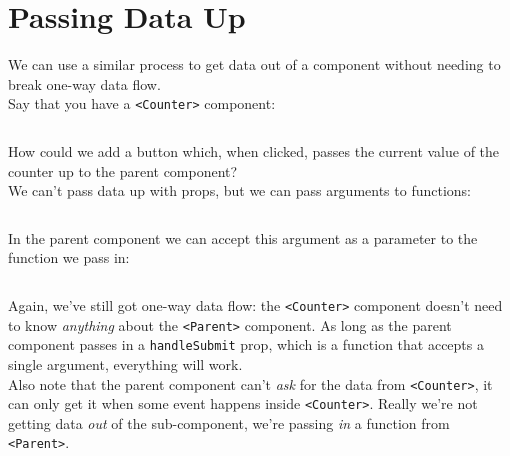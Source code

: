 \section{Passing Data Up}

We can use a similar process to get data out of a component without needing to break one-way data flow.
\\

Say that you have a \texttt{<Counter>} component:

\inputminted{js}{05-one-way-data-flow/figures/07-Counter.jsx}

How could we add a button which, when clicked, passes the current value of the counter up to the parent component?
\\

We can't pass data up with props, but we can pass arguments to functions:

\inputminted{js}{05-one-way-data-flow/figures/08-Counter-with-parent.jsx}

In the parent component we can accept this argument as a parameter to the function we pass in:

\inputminted{js}{05-one-way-data-flow/figures/09-Parent.jsx}

Again, we've still got one-way data flow: the \texttt{<Counter>} component doesn't need to know \textit{anything} about the \texttt{<Parent>} component. As long as the parent component passes in a \texttt{handleSubmit} prop, which is a function that accepts a single argument, everything will work.
\\

Also note that the parent component can't \textit{ask} for the data from \texttt{<Counter>}, it can only get it when some event happens inside \texttt{<Counter>}. Really we're not getting data \textit{out} of the sub-component, we're passing \textit{in} a function from \texttt{<Parent>}.
